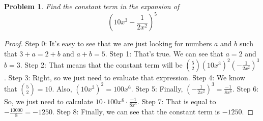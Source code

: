 \documentclass{article}
\newtheorem{theorem}{Problem}
\begin{document}
\begin{theorem}
Find the constant term in the expansion of $$\left(10x^3-\frac{1}{2x^2}\right)^{5}$$
\end{theorem}

\begin{proof}
Step 0: It's easy to see that we are just looking for numbers $a$ and $b$ such that $3+a=2+b$ and $a+b=5$.
Step 1: That's true. We can see that $a=2$ and $b=3$.
Step 2: That means that the constant term will be $\binom{5}{2}(10x^3)^{2}\left(-\frac{1}{2x^2}\right)^{3}$.
Step 3: Right, so we just need to evaluate that expression.
Step 4: We know that $\binom{5}{2}=10$. Also, $(10x^3)^{2}=100x^6$.
Step 5: Finally, $\left(-\frac{1}{2x^2}\right)^{3}=\frac{-1}{8x^6}$.
Step 6: So, we just need to calculate $10\cdot 100x^6 \cdot \frac{-1}{8x^6}$.
Step 7: That is equal to $-\frac{10000}{8}=-1250$.
Step 8: Finally, we can see that the constant term is $-1250$.
\end{proof}
\end{document}
